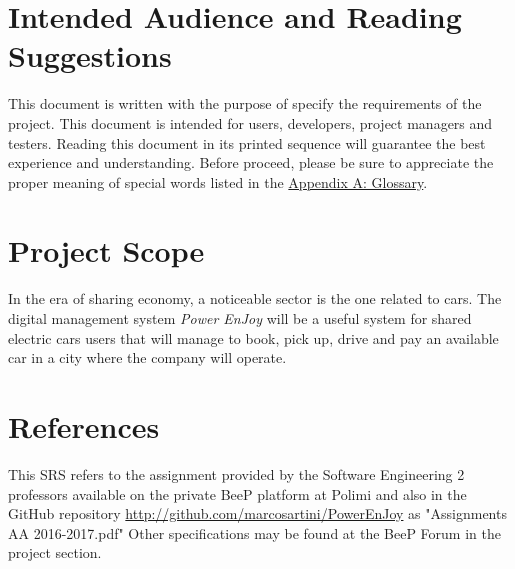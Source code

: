 \documentclass{scrreprt}
\begin{document}
\section{Intended Audience and Reading Suggestions}
This document is written with the purpose of specify the requirements of the project. 
This document is intended for users, developers, project managers and testers.
Reading this document in its printed sequence will guarantee the best experience and understanding.
Before proceed, please be sure to appreciate the proper meaning of special words listed in the \hyperref[sec:glossary]{Appendix A: Glossary}.
\begin{comment}$<$Describe the different types of reader that the document is intended for, 
such as developers, project managers, marketing staff, users, testers, and 
documentation writers. Describe what the rest of this SRS contains and how it is 
organized. Suggest a sequence for reading the document, beginning with the 
overview sections and proceeding through the sections that are most pertinent to 
each reader type.$>$
\end{comment}

\section{Project Scope}
In the era of sharing economy, a noticeable sector is the one related to cars.
The digital management system \emph{Power EnJoy} will be a useful system for shared electric cars users that will manage to book, pick up, drive and pay an available car in a city where the company will operate.
\begin{comment}$<$Provide a short description of the software being specified and its purpose, 
including relevant benefits, objectives, and goals. Relate the software to 
corporate goals or business strategies. If a separate vision and scope document 
is available, refer to it rather than duplicating its contents here.$>$
\end{comment}

\section{References}
This SRS refers to the assignment provided by the Software Engineering 2 professors available on the private BeeP platform at Polimi and also in the GitHub repository \url{http://github.com/marcosartini/PowerEnJoy} as "Assignments AA 2016-2017.pdf"
Other specifications may be found at the BeeP Forum in the project section.
\begin{comment}$<$List any other documents or Web addresses to which this SRS refers. These may 
include user interface style guides, contracts, standards, system requirements 
specifications, use case documents, or a vision and scope document. Provide 
enough information so that the reader could access a copy of each reference, 
including title, author, version number, date, and source or location.$>$
\end{comment}
\end{document}
